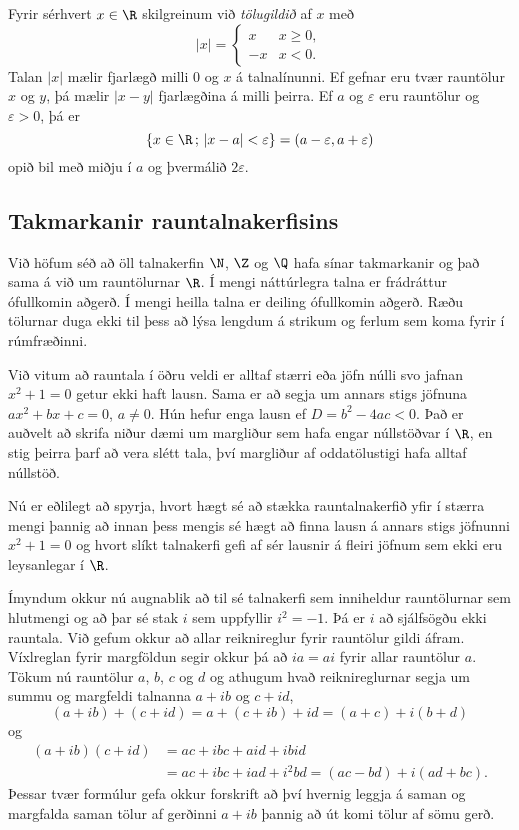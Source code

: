 Fyrir sérhvert $x\in \R$ skilgreinum við {\it tölugildið} af
$x$ með 
$$
|x|=\begin{cases}
x &x\geq 0, \\
-x &x <0. 
\end{cases}
$$ 
Talan $|x|$ mælir fjarlægð milli  $0$ og $x$ á talnalínunni.
Ef gefnar eru tvær rauntölur $x$ og $y$, þá mælir 
$|x-y|$ fjarlægðina á milli þeirra.  Ef $a$ og $\varepsilon$ eru rauntölur og
$\varepsilon>0$, þá er
$$
\{x\in \R\,;\,  |x-a|<\varepsilon\}=(a-\varepsilon,a+\varepsilon)
$$
opið bil með miðju í $a$ og þvermálið $2\varepsilon$.


\subsection*{Takmarkanir rauntalnakerfisins}

Við höfum séð að öll talnakerfin $\N$, $\Z$ og $\Q$ hafa sínar
takmarkanir og það sama á við um rauntölurnar $\R$.  Í mengi
náttúrlegra talna er frádráttur ófullkomin aðgerð. Í mengi heilla
talna er deiling ófullkomin aðgerð.  Ræðu tölurnar duga ekki til þess
að lýsa lengdum á strikum og ferlum sem koma fyrir í rúmfræðinni.

Við vitum að rauntala í öðru veldi er alltaf stærri eða jöfn núlli 
svo jafnan $x^2+1=0$ getur ekki haft lausn.  Sama er að segja um 
annars stigs jöfnuna $ax^2+bx+c=0$, $a\neq 0$. Hún hefur enga lausn
ef $D=b^2-4ac<0$.   Það er auðvelt að skrifa niður dæmi um margliður
sem hafa engar núllstöðvar í $\R$, en stig þeirra þarf að vera slétt
tala, því margliður af oddatölustigi hafa alltaf núllstöð.  

Nú er eðlilegt að spyrja, hvort hægt sé að stækka rauntalnakerfið
yfir  í stærra mengi
þannig að innan þess mengis sé hægt að finna lausn á annars stigs
jöfnunni $x^2+1=0$ og hvort slíkt talnakerfi gefi af sér lausnir 
á fleiri jöfnum sem ekki eru leysanlegar í $\R$.

Ímyndum  okkur nú augnablik að til sé talnakerfi sem inniheldur rauntölurnar
sem hlutmengi og að þar sé stak $i$ sem uppfyllir $i^2=-1$.
Þá er $i$ að sjálfsögðu ekki rauntala.   Við gefum okkur að allar
reiknireglur fyrir rauntölur gildi áfram.  Víxlreglan fyrir margföldun
segir okkur þá að $ia=ai$ fyrir allar rauntölur $a$.
Tökum nú rauntölur $a$, $b$, $c$ og  $d$ og athugum hvað reiknireglurnar
segja um  summu og margfeldi talnanna $a+ib$ og $c+id$,
$$
(a+ib)+(c+id)=a+(c+ib)+id=(a+c)+i(b+d)
$$
og 
\begin{align*}
(a+ib)(c+id)&=ac+ibc+aid+ibid \\
&=ac+ibc+ iad+i^2 bd 
=(ac-bd)+i(ad+bc). 
\end{align*}
Þessar tvær formúlur gefa okkur forskrift að því hvernig leggja á saman
og margfalda saman tölur af gerðinni $a+ib$ þannig að út komi tölur af
sömu gerð.  


